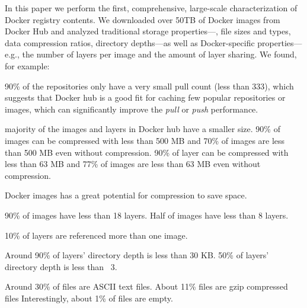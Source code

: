 In this paper we perform the first, comprehensive, large-scale characterization of
Docker registry contents.
%
We downloaded over 50TB of Docker images from Docker Hub and analyzed
traditional storage properties---\eg, file sizes and types, data compression
ratios, directory depths---as well as Docker-specific properties---e.g., the number
of layers per image and the amount of layer sharing.
%
%
We found, for example:
\begin{compactenumerate}
	\item 90\% of the repositories only have a very small pull count (less than 333), which suggests that Docker hub is a good fit for caching few popular repositories or images, which can significantly improve the \textit{pull} or \textit{push} performance.
	\item majority of the images and layers in Docker hub have a smaller size. 90\% of images can be compressed with less than 500 MB and 70\% of images are less than 500 MB even without compression. 90\% of layer can be compressed with less than 63 MB and 77\% of images are less than 63 MB even without compression.
	\item Docker images has a great potential for compression to save space.
	\item 90\% of images have less than 18 layers. Half of images have less than 8 layers. 
	\item 10\% of layers are referenced more than one image.
	\item Around 90\% of layers' directory depth is less than 30 KB. 50\% of layers' directory depth is less than ~3.
	\item Around 30\% of files are ASCII text files. 
	About 11\% files are gzip compressed files 
	Interestingly, about 1\% of files are empty. 
\end{compactenumerate}
%

%

